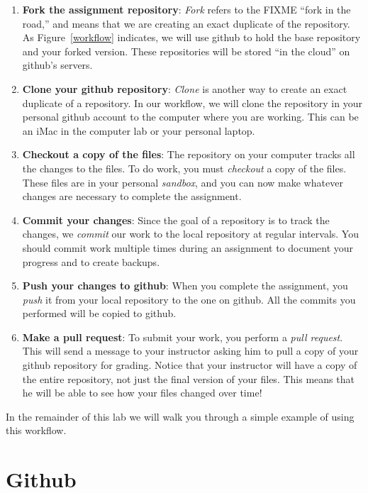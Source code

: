 \documentclass[11pt]{article}
\begin{document}
\begin{enumerate}
\item {\bf Fork the assignment repository}:  {\em Fork} refers to the FIXME ``fork in the road,'' and means that we are creating an exact duplicate of the repository.  As Figure~\ref{workflow} indicates, we will use github to hold the base repository and your forked version.  These repositories will be stored ``in the cloud'' on github's servers.

\item {\bf Clone your github repository}:  {\em Clone} is another way to create an exact duplicate of a repository.  In our workflow, we will clone the repository in your personal github account to the computer where you are working.  This can be an iMac in the computer lab or your personal laptop.

\item {\bf Checkout a copy of the files}:  The repository on your computer tracks all the changes to the files.  To do work, you must {\em checkout} a copy of the files.  These files are in your personal {\em sandbox}, and you can now make whatever changes are necessary to complete the assignment.

\item {\bf Commit your changes}:  Since the goal of a repository is to track the changes, we {\em commit} our work to the local repository at regular intervals.  You should commit work multiple times during an assignment to document your progress and to create backups.

\item {\bf Push your changes to github}:  When you complete the assignment, you {\em push} it from your local repository to the one on github.  All the commits you performed will be copied to github.

\item {\bf Make a pull request}:  To submit your work, you perform a {\em pull request}.  This will send a message to your instructor asking him to pull a copy of your github repository for grading.  Notice that your instructor will have a copy of the entire repository, not just the final version of your files.  This means that he will be able to see how your files changed over time!
\end{enumerate}

In the remainder of this lab we will walk you through a simple example of using this workflow.

\section*{Github}
\end{document}
